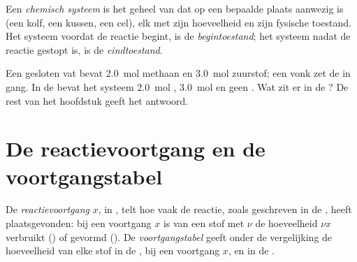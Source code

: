 \begin{definition}\label{def:g10:reaction-progress-table:system}
Een \emph{chemisch systeem} is het geheel van
 dat op een bepaalde plaats aanwezig is (een kolf, een
kussen, een cel), elk met zijn hoeveelheid en zijn fysische toestand. Het
systeem voordat de reactie begint, is de
\emph{begintoestand}; het systeem nadat de reactie
gestopt is, is de \emph{eindtoestand}.
\end{definition}


\begin{example}\label{ex:g10:reaction-progress-table:methane}
Een gesloten vat bevat \qty{2.0}{mol} methaan en \qty{3.0}{mol}
zuurstof; een vonk zet de 
 in gang. In de  bevat het
systeem \qty{2.0}{mol} , \qty{3.0}{mol}  en geen
. Wat zit er in de ? De rest van het
hoofdstuk geeft het antwoord.
\end{example}

\section{De reactievoortgang en de voortgangstabel}

\begin{definition}\label{def:g10:reaction-progress-table:extent}
De \emph{reactievoortgang} $x$, in , telt hoe
vaak de reactie, zoals geschreven in de ,
heeft plaatsgevonden: bij een voortgang $x$ is van een stof met
 $\nu$ de hoeveelheid $\nu x$ verbruikt () of
gevormd (). De
\emph{voortgangstabel} geeft onder de
vergelijking de hoeveelheid van elke stof in de , bij een
voortgang $x$, en in de .
\end{definition}

